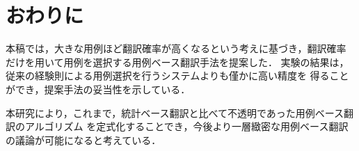 \section{おわりに}

本稿では，大きな用例ほど翻訳確率が高くなるという考えに基づき，翻訳確率
だけを用いて用例を選択する用例ベース翻訳手法を提案した．
実験の結果は，従来の経験則による用例選択を行うシステムよりも僅かに高い精度を
得ることができ，提案手法の妥当性を示している．

本研究により，これまで，統計ベース翻訳と比べて不透明であった用例ベース翻訳のアルゴリズム
を定式化することでき，今後より一層緻密な用例ベース翻訳の議論が可能になると考えている．







